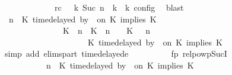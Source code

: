 \begin{isabellebody}
\ \ \ \ \ \ \ \ \ \ \ \ \ rc{\isacharcolon}{\isacartoucheopen}{\isasymrho}\ {\isasymin}\ {\isasymlbrakk}\ {\isasymGamma}\isactrlsub k{\isacharcomma}\ Suc\ n\ {\isasymturnstile}\ {\isasymPsi}\isactrlsub k\ {\isasymtriangleright}\ {\isasymPhi}\isactrlsub k\ {\isasymrbrakk}\isactrlsub c\isactrlsub o\isactrlsub n\isactrlsub f\isactrlsub i\isactrlsub g{\isacartoucheclose}\ \isamarkupfalse%
\ blast\isanewline
\ \ \ \ \ \ \ \ \isamarkupfalse%
\ {\isacartoucheopen}{\isacharparenleft}{\isasymGamma}{\isacharcomma}\ n\ {\isasymturnstile}\ {\isacharparenleft}{\isacharparenleft}K\ time{\isacharminus}delayed\ by\ {\isasymdelta}{\isasymtau}\ on\ K\ implies\ K\ {\isacharhash}\ {\isasymPsi}{\isacharparenright}\ {\isasymtriangleright}\ {\isasymPhi}{\isacharparenright}\isanewline
\ \ \ \ \ \ \ \ \ \ \ \ \ \ {\isasymhookrightarrow}\ {\isacharparenleft}{\isacharparenleft}{\isacharparenleft}K\ {\isasymUp}\ n{\isacharparenright}\ {\isacharhash}\ {\isacharparenleft}K\ {\isacharat}\ n\ {\isasymoplus}\ {\isasymdelta}{\isasymtau}\ {\isasymRightarrow}\ K\ {\isacharhash}\ {\isasymGamma}{\isacharparenright}{\isacharcomma}\ n\isanewline
\ \ \ \ \ \ \ \ \ \ \ \ \ \ \ \ \ \ {\isasymturnstile}\ {\isasymPsi}\ {\isasymtriangleright}\ {\isacharparenleft}{\isacharparenleft}K\ time{\isacharminus}delayed\ by\ {\isasymdelta}{\isasymtau}\ on\ K\ implies\ K\ {\isacharhash}\ {\isasymPhi}{\isacharparenright}{\isacharparenright}{\isacartoucheclose}\isanewline
\ \ \ \ \ \ \ \ \ \ \isamarkupfalse%
\ {\isacharparenleft}simp\ add{\isacharcolon}\ elims{\isacharunderscore}part\ timedelayed{\isacharunderscore}e{}{\isacharparenright}\isanewline
\ \ \ \ \ \ \ \ \isamarkupfalse%
\ fp\ relpowp{\isacharunderscore}Suc{\isacharunderscore}I{}\ \isamarkupfalse%
\isanewline
\ \ \ \ \ \ \ \ \ \ {\isacartoucheopen}{\isacharparenleft}{\isasymGamma}{\isacharcomma}\ n\ {\isasymturnstile}\ {\isacharparenleft}{\isacharparenleft}K\ time{\isacharminus}delayed\ by\ {\isasymdelta}{\isasymtau}\ on\ K\ implies\ K\ {\isacharhash}\ {\isasymPsi}{\isacharparenright}\ {\isasymtriangleright}\ {\isasymPhi}{\isacharparenright}\isanewline

\end{isabellebody}
